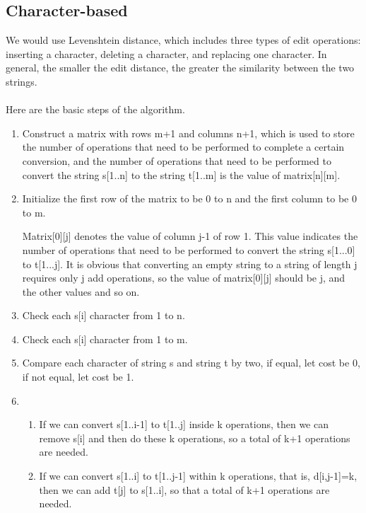 \documentclass[]{article}
\begin{document}
\subsection{Character-based}
We would use Levenshtein distance, which includes three types of edit operations: inserting a character, deleting a character, and replacing one character. In general, the smaller the edit distance, the greater the similarity between the two strings.
\\\\Here are the basic steps of the algorithm. 
\begin{enumerate}
    \item Construct a matrix with rows m+1 and columns n+1, which is used to store the number of operations that need to be performed to complete a certain conversion, and the number of operations that need to be performed to convert the string s[1..n] to the string t[1..m] is the value of matrix[n][m].

    \item Initialize the first row of the matrix to be 0 to n and the first column to be 0 to m.

    Matrix[0][j] denotes the value of column j-1 of row 1. This value indicates the number of operations that need to be performed to convert the string s[1...0] to t[1...j]. It is obvious that converting an empty string to a string of length j requires only j add operations, so the value of matrix[0][j] should be j, and the other values and so on.
    
    \item Check each s[i] character from 1 to n.

    \item Check each s[i] character from 1 to m.

    \item Compare each character of string s and string t by two, if equal, let cost be 0, if not equal, let cost be 1.

    \item
    \begin{enumerate}
        \item If we can convert s[1..i-1] to t[1..j] inside k operations, then we can remove s[i] and then do these k operations, so a total of k+1 operations are needed.

        \item If we can convert s[1..i] to t[1..j-1] within k operations, that is, d[i,j-1]=k, then we can add t[j] to s[1..i], so that a total of k+1 operations are needed.


\end{enumerate}
\end{enumerate}
\end{document}
